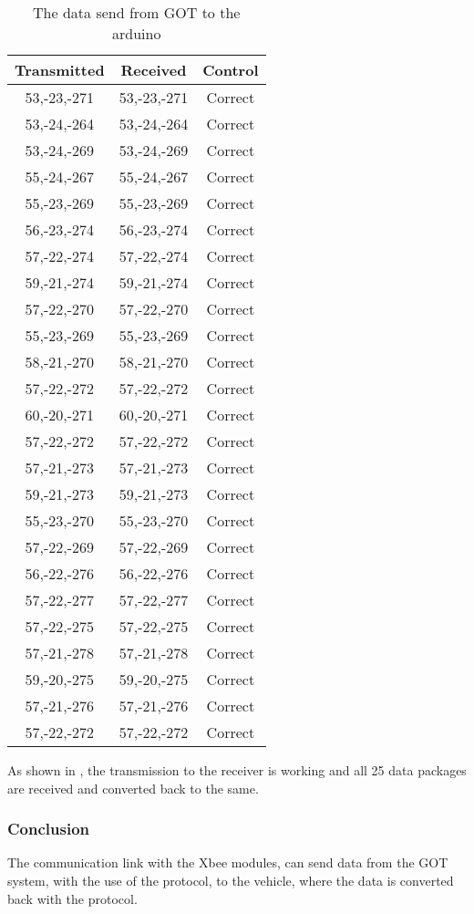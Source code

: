 \begin{table}[H]
\begin{tabular}{|c||c||c|}
\hline
Transmitted & Received & Control \\
\hline
53,-23,-271 & 53,-23,-271 & Correct \\
\hline
53,-24,-264 & 53,-24,-264 & Correct \\
\hline
53,-24,-269 & 53,-24,-269 & Correct \\
\hline
55,-24,-267 & 55,-24,-267 & Correct \\
\hline
55,-23,-269 & 55,-23,-269 & Correct \\
\hline
56,-23,-274 & 56,-23,-274 & Correct \\
\hline
57,-22,-274 & 57,-22,-274 & Correct \\
\hline
59,-21,-274 & 59,-21,-274 & Correct \\
\hline
57,-22,-270 & 57,-22,-270 & Correct \\
\hline
55,-23,-269 & 55,-23,-269 & Correct \\
\hline
58,-21,-270 & 58,-21,-270 & Correct \\
\hline
57,-22,-272 & 57,-22,-272 & Correct \\
\hline
60,-20,-271 & 60,-20,-271 & Correct \\
\hline
57,-22,-272 & 57,-22,-272 & Correct \\
\hline
57,-21,-273 & 57,-21,-273 & Correct \\
\hline
59,-21,-273 & 59,-21,-273 & Correct \\
\hline
55,-23,-270 & 55,-23,-270 & Correct \\
\hline
57,-22,-269 & 57,-22,-269 & Correct \\
\hline
56,-22,-276 & 56,-22,-276 & Correct \\
\hline
57,-22,-277 & 57,-22,-277 & Correct \\
\hline
57,-22,-275 & 57,-22,-275 & Correct \\
\hline
57,-21,-278 & 57,-21,-278 & Correct \\
\hline
59,-20,-275 & 59,-20,-275 & Correct \\
\hline
57,-21,-276 & 57,-21,-276 & Correct \\
\hline
57,-22,-272 & 57,-22,-272 & Correct \\
\hline
\end{tabular}
\caption{The data send from GOT to the arduino}
\label{AccTest1Tab2}
\end{table}

As shown in , the transmission to the receiver is working and all 25 data packages are received and converted back to the same.

\subsubsection{Conclusion}
The communication link with the Xbee modules, can send data from the GOT system, with the use of the protocol, to the vehicle, where the data is converted back with the protocol.
